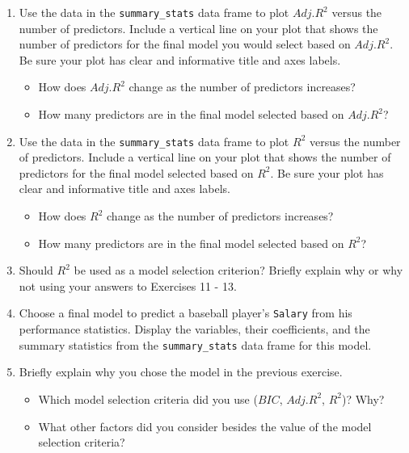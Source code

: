 \documentclass[]{book}
\providecommand{\tightlist}{%
  \setlength{\itemsep}{0pt}\setlength{\parskip}{0pt}}
\begin{document}
\begin{enumerate}
\def\labelenumi{\arabic{enumi}.}
\setcounter{enumi}{11}
\item
  Use the data in the \texttt{summary\_stats} data frame to plot
  \(Adj. R^2\) versus the number of predictors. Include a vertical line
  on your plot that shows the number of predictors for the final model
  you would select based on \(Adj. R^2\). Be sure your plot has clear
  and informative title and axes labels.

  \begin{itemize}
  \tightlist
  \item
    How does \(Adj. R^2\) change as the number of predictors increases?
  \item
    How many predictors are in the final model selected based on
    \(Adj. R^2\)?
  \end{itemize}
\item
  Use the data in the \texttt{summary\_stats} data frame to plot \(R^2\)
  versus the number of predictors. Include a vertical line on your plot
  that shows the number of predictors for the final model selected based
  on \(R^2\). Be sure your plot has clear and informative title and axes
  labels.

  \begin{itemize}
  \tightlist
  \item
    How does \(R^2\) change as the number of predictors increases?
  \item
    How many predictors are in the final model selected based on
    \(R^2\)?
  \end{itemize}
\item
  Should \(R^2\) be used as a model selection criterion? Briefly explain
  why or why not using your answers to Exercises 11 - 13.
\item
  Choose a final model to predict a baseball player's \texttt{Salary}
  from his performance statistics. Display the variables, their
  coefficients, and the summary statistics from the
  \texttt{summary\_stats} data frame for this model.
\item
  Briefly explain why you chose the model in the previous exercise.

  \begin{itemize}
  \tightlist
  \item
    Which model selection criteria did you use (\(BIC\), \(Adj. R^2\),
    \(R^2\))? Why?
  \item
    What other factors did you consider besides the value of the model
    selection criteria?
  \end{itemize}
\end{enumerate}
\end{document}
